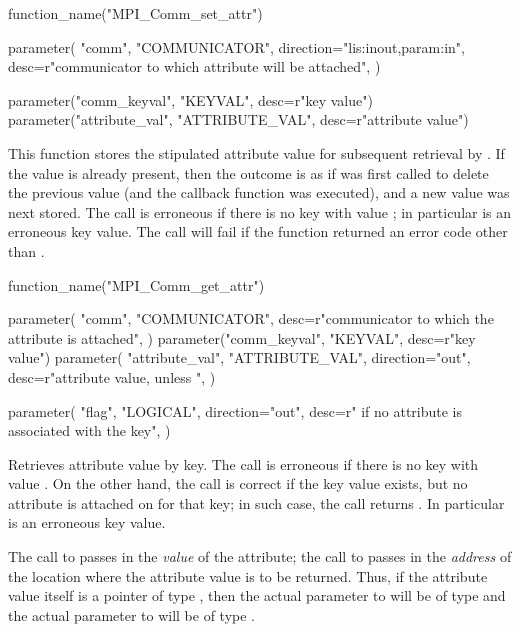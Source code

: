 %
\begin{mpi-binding}
    function_name("MPI_Comm_set_attr")
    
    parameter(
        "comm",
        "COMMUNICATOR",
        direction="lis:inout,param:in",
        desc=r"communicator to which attribute will be attached",
    )
    
    parameter("comm_keyval", "KEYVAL", desc=r"key value")
    parameter("attribute_val", "ATTRIBUTE_VAL", desc=r"attribute value")
\end{mpi-binding}

This function stores the stipulated attribute value 
for subsequent retrieval by .
If the value is already present, then the outcome
is as if  %
was first called to delete the previous
value (and the callback function  was executed), and a new
value was next stored. The call is erroneous if there is no key with value
; in particular
 is an erroneous key value.
The call will fail if the  function returned an error code
other than .

%
\begin{mpi-binding}
    function_name("MPI_Comm_get_attr")
    
    parameter(
        "comm",
        "COMMUNICATOR",
        desc=r"communicator to which the attribute is attached",
    )
    parameter("comm_keyval", "KEYVAL", desc=r"key value")
    parameter(
        "attribute_val",
        "ATTRIBUTE_VAL",
        direction="out",
        desc=r"attribute value, unless ",
    )
    
    parameter(
        "flag",
        "LOGICAL",
        direction="out",
        desc=r" if no attribute is associated with the key",
    )
\end{mpi-binding}

Retrieves attribute value by key.
The call is erroneous if there is no key with value
. On the other hand, the call is correct if the key value
exists, but no attribute is attached on  for that key; in such case,
the call returns . In particular
 is an erroneous key value.

\begin{users}
The call to  passes in 
the \emph{value} of the attribute; the call to 
passes in  the \emph{address} of
the
location where the attribute value is to be returned.
Thus, if the attribute value itself is a pointer of type , 
then the
actual  parameter to
 will be of type  and the actual
 parameter to
will be of type .
\end{users}

